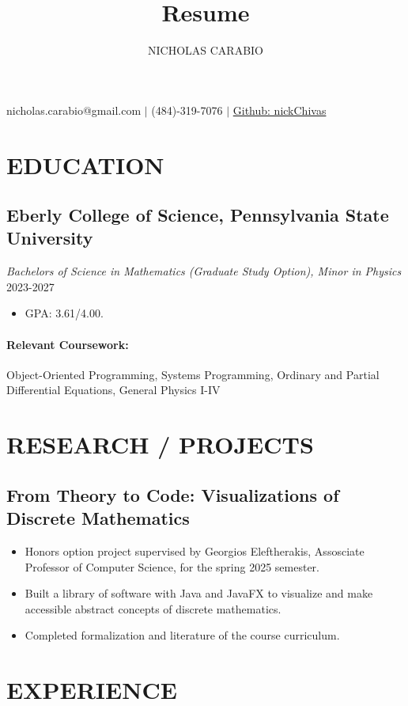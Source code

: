 \documentclass{article}
\makeatletter
\renewcommand{\maketitle}{
\begin{center}
{\huge\bfseries\theauthor}

\vspace{.25em}

nicholas.carabio@gmail.com $|$ (484)-319-7076 $|$ \href{https://github.com/nickChivas}{Github: nickChivas}
\end{center}
}
\makeatother
\begin{document}
\title{Resume}
\author{NICHOLAS CARABIO}

\maketitle

\section{EDUCATION}
\subsection{Eberly College of Science, Pennsylvania State University}
\emph{Bachelors of Science in Mathematics (Graduate Study Option), Minor in Physics} \hfill 2023-2027
\begin{itemize}
  \setlength\itemsep{0in}
\item GPA: 3.61/4.00.
\end{itemize}
\paragraph{Relevant Coursework: } Object-Oriented Programming, Systems Programming,
Ordinary and Partial Differential Equations, General Physics I-IV

\section{RESEARCH / PROJECTS}
\subsection{From Theory to Code: Visualizations of Discrete Mathematics}
\begin{itemize}
  \setlength\itemsep{0in}
  \item  Honors option project supervised by Georgios Eleftherakis, Assosciate Professor of Computer Science,
  for the spring 2025 semester.
  \item Built a library of software with Java and JavaFX to visualize and make accessible 
  abstract concepts of discrete mathematics.
  \item Completed formalization and literature of the course curriculum. 
\end{itemize}

\section{EXPERIENCE}
\end{document}
